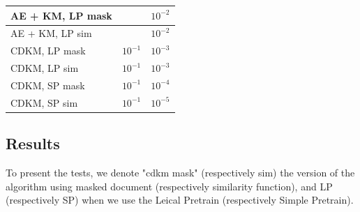 \begin{table}
{\begin{tabular}{|l|l|l|}
    AE + KM, LP mask  &\cellcolor{gray}  &$10^{-2}$         \\ \hline
    AE + KM, LP sim   &\cellcolor{gray}  &$10^{-2}$         \\ \hline
       CDKM, LP mask  &$10^{-1}$  &$10^{-3}$         \\ \hline
       CDKM, LP sim   &$10^{-1}$  &$10^{-3}$         \\ \hline
       CDKM, SP mask  &$10^{-1}$  &$10^{-4}$         \\ \hline
       CDKM, SP sim   &$10^{-1}$  &$10^{-5}$         \\ \hline
\end{tabular}
}
\end{table}
\subsection{\label{seq:results}Results}
To present the tests, we denote "cdkm mask" (respectively sim) the version of 
the algorithm using masked document (respectively similarity function), and LP
(respectively SP) when we use the Leical Pretrain (respectively Simple Pretrain).
